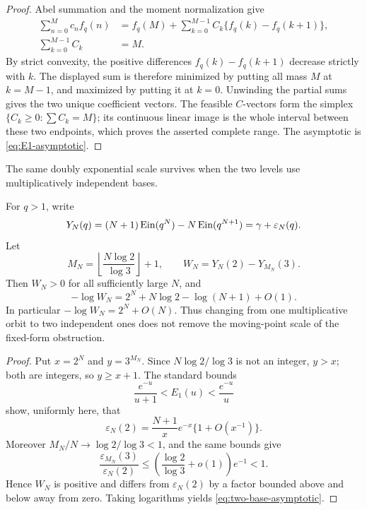 \begin{proof}
Abel summation and the moment normalization give
\begin{align*}
 \sum_{n=0}^Mc_nf_q(n)
 &=f_q(M)+\sum_{k=0}^{M-1}C_k\{f_q(k)-f_q(k+1)\},\\
 \sum_{k=0}^{M-1}C_k&=M.
\end{align*}
By strict convexity, the positive differences
\(f_q(k)-f_q(k+1)\) decrease strictly with \(k\).  The displayed sum is
therefore minimized by putting all mass \(M\) at \(k=M-1\), and maximized
by putting it at \(k=0\).  Unwinding the partial sums gives the two unique
coefficient vectors.  The feasible \(C\)-vectors form the simplex
\(\{C_k\ge0:\sum C_k=M\}\); its continuous linear image is the whole
interval between these two endpoints, which proves the asserted complete
range.  The asymptotic is \eqref{eq:E1-asymptotic}.
\end{proof}

The same doubly exponential scale survives when the two levels use
multiplicatively independent bases.

\begin{proposition}
\label{prop:two-base-obstruction}
For \(q>1\), write
\[
 Y_N(q)=(N+1)\operatorname{Ein}(q^N)-N\operatorname{Ein}(q^{N+1})
       =\gamma+\varepsilon_N(q).
\]
Let
\[
 M_N=\left\lfloor\frac{N\log2}{\log3}\right\rfloor+1,
 \qquad W_N=Y_N(2)-Y_{M_N}(3).
\]
Then \(W_N>0\) for all sufficiently large \(N\), and
\begin{equation}\label{eq:two-base-asymptotic}
 \boxed{\displaystyle
 -\log W_N
 =2^N+N\log2-\log(N+1)+O(1).}
\end{equation}
In particular \(-\log W_N=2^N+O(N)\).  Thus changing from one
multiplicative orbit to two independent ones does not remove the
moving-point scale of the fixed-form obstruction.
\end{proposition}

\begin{proof}
Put \(x=2^N\) and \(y=3^{M_N}\).  Since
\(N\log2/\log3\) is not an integer, \(y>x\); both are integers, so
\(y\ge x+1\).  The standard bounds
\[
 \frac{e^{-u}}{u+1}<E_1(u)<\frac{e^{-u}}u
\]
show, uniformly here, that
\[
 \varepsilon_N(2)
 =\frac{N+1}{x}e^{-x}\{1+O(x^{-1})\}.
\]
Moreover \(M_N/N\to\log2/\log3<1\), and the same bounds give
\[
 \frac{\varepsilon_{M_N}(3)}{\varepsilon_N(2)}
 \le
 \left(\frac{\log2}{\log3}+o(1)\right)e^{-1}<1.
\]
Hence \(W_N\) is positive and differs from \(\varepsilon_N(2)\) by a
factor bounded above and below away from zero.  Taking logarithms yields
\eqref{eq:two-base-asymptotic}.
\end{proof}

